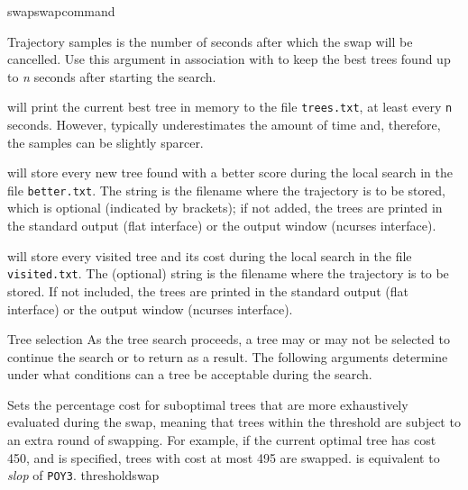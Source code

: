 \begin{command}{swap}{swapcommand}
\begin{arguments}
\begin{argumentgroup}{Trajectory samples}
	{is the number of seconds after which the swap will
           be cancelled. Use this argument in association with 
           to keep the best trees found up to \emph{n} seconds after
           starting the search.}
                {}

			{ will print the current
                best tree in memory to the file \texttt{trees.txt}, at least every 
                \texttt{n} seconds. However, \poy typically underestimates the amount of
                time and, therefore, the samples can be slightly sparcer.}
            {}

			{ will store every new tree
                found with a better score during the local search in the file
                \texttt{better.txt}. The string is the filename where the
                trajectory is to be stored, which is optional (indicated by
                brackets); if not added, the trees are printed in the standard
                output (flat interface) or the output window (ncurses
                interface).}
            {} 

            { will store every visited tree
            and its cost during the local search in the file
            \texttt{visited.txt}. The (optional) string is the filename where the
            trajectory is to be stored. If not included, the trees are printed
            in the standard output (flat interface) or the output window (ncurses
            interface).}
            {}
    
    \end{argumentgroup}

    \begin{argumentgroup}{Tree selection}
        {As the tree search proceeds, a tree may or may not be selected to
        continue the search or to return as a result. The following
        arguments determine under what conditions can a tree be acceptable
        during the search.}

            {Sets the percentage cost for suboptimal
            trees that are more exhaustively evaluated during the swap,
            meaning that trees within the threshold are subject to an extra
            round of swapping. For example, if the current
            optimal tree has cost 450, and  is specified, trees
            with cost at most 495 are swapped.   is
            equivalent to \emph{slop} of  \texttt{POY3}.}
            {thresholdswap}


\end{argumentgroup}
\end{arguments}
\end{command}
